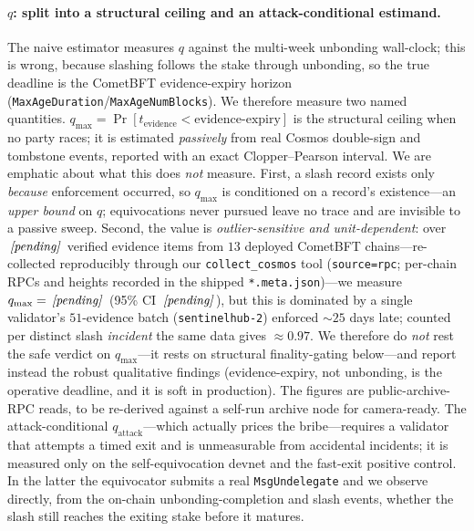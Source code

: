\paragraph{$q$: split into a structural ceiling and an attack-conditional estimand.}
The naive estimator measures $q$ against the multi-week unbonding wall-clock; this is wrong, because
slashing follows the stake through unbonding, so the true deadline is the CometBFT evidence-expiry
horizon (\texttt{MaxAgeDuration}/\texttt{MaxAgeNumBlocks}). We therefore measure two named quantities.
$q_{\max}=\Pr[t_{\mathrm{evidence}}<\text{evidence-expiry}]$ is the structural ceiling when no party
races; it is estimated \emph{passively} from real Cosmos double-sign and tombstone events, reported
with an exact Clopper--Pearson interval. We are emphatic about what this does \emph{not} measure.
First, a slash record exists only \emph{because} enforcement occurred, so $q_{\max}$ is conditioned on
a record's existence---an \emph{upper bound} on $q$; equivocations never pursued leave no trace and are
invisible to a passive sweep. Second, the value is \emph{outlier-sensitive and unit-dependent}: over
$\,\textit{[pending]}\,$ verified evidence items from $13$ deployed CometBFT chains---re-collected reproducibly
through our \texttt{collect\_cosmos} tool (\texttt{source=rpc}; per-chain RPCs and heights recorded in
the shipped \texttt{*.meta.json})---we measure $q_{\max}=\,\textit{[pending]}\,$ (95\% CI
$\,\textit{[pending]}\,$), but this is dominated by a single validator's $51$-evidence batch
(\texttt{sentinelhub-2}) enforced ${\sim}25$ days late; counted per distinct slash \emph{incident} the
same data gives ${\approx}0.97$. We therefore do \emph{not} rest the safe verdict on $q_{\max}$---it
rests on structural finality-gating below---and report instead the robust qualitative findings
(evidence-expiry, not unbonding, is the operative deadline, and it is soft in production). The figures
are public-archive-RPC reads, to be re-derived against a self-run archive node for camera-ready. The
attack-conditional
$q_{\mathrm{attack}}$---which actually prices the bribe---requires a validator that attempts a timed
exit and is unmeasurable from accidental incidents; it is measured only on the self-equivocation
devnet and the fast-exit positive control. In the latter the equivocator submits a real
\texttt{MsgUndelegate} and we observe directly, from the on-chain unbonding-completion and slash
events, whether the slash still reaches the exiting stake before it matures.

